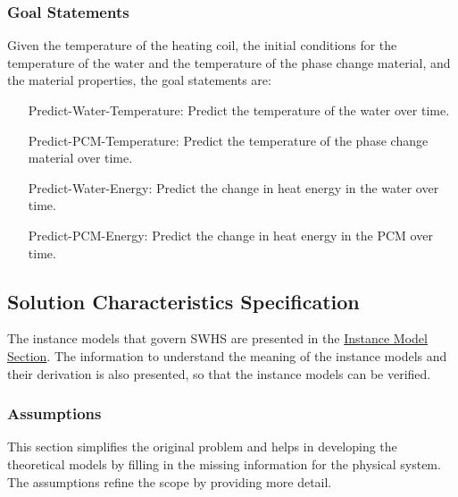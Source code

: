 \documentclass[12pt]{article}
\begin{document}
\subsubsection{Goal Statements}
\label{Sec:GoalStmt}
Given the temperature of the heating coil, the initial conditions for the temperature of the water and the temperature of the phase change material, and the material properties, the goal statements are:

\begin{itemize}
\item[Predict-Water-Temperature:\phantomsection\label{waterTempGS}]{Predict the temperature of the water over time.}
\item[Predict-PCM-Temperature:\phantomsection\label{pcmTempGS}]{Predict the temperature of the phase change material over time.}
\item[Predict-Water-Energy:\phantomsection\label{waterEnergyGS}]{Predict the change in heat energy in the water over time.}
\item[Predict-PCM-Energy:\phantomsection\label{pcmEnergyGS}]{Predict the change in heat energy in the PCM over time.}
\end{itemize}
\subsection{Solution Characteristics Specification}
\label{Sec:SolCharSpec}
The instance models that govern SWHS are presented in the \hyperref[Sec:IMs]{Instance Model Section}. The information to understand the meaning of the instance models and their derivation is also presented, so that the instance models can be verified.

\subsubsection{Assumptions}
\label{Sec:Assumps}
This section simplifies the original problem and helps in developing the theoretical models by filling in the missing information for the physical system. The assumptions refine the scope by providing more detail.
\end{document}
